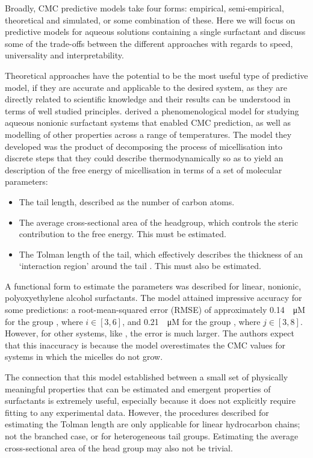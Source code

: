 Broadly, CMC predictive models take four forms: empirical, semi-empirical,
theoretical and simulated, or some combination of these. Here we will focus on
predictive models for aqueous solutions containing a single surfactant and
discuss some of the trade-offs between the different approaches with regards to
speed, universality and interpretability.

Theoretical approaches have the potential to be the most useful type of
predictive model, if they are accurate and applicable to the desired system, as
they are directly related to scientific knowledge and their results can be
understood in terms of well studied principles.
\citet{puvvadaMolecularThermodynamicApproach1990} derived a phenomenological
model for studying aqueous nonionic surfactant systems that enabled CMC
prediction, as well as modelling of other properties across a range of
temperatures. The model they developed was the product of decomposing the
process of micellisation into discrete steps that they could describe
thermodynamically so as to yield an description of the free energy of
micellisation in terms of a set of molecular parameters:

\begin{itemize}
    \item The tail length, described as the number of carbon atoms.
    \item The average cross-sectional area of the headgroup, which controls the
        steric contribution to the free energy. This must be estimated.
    \item The Tolman length of the tail, which effectively describes the
        thickness of an `interaction region' around the tail
        \cite{demiguelGibbsThermodynamicsSurface2021}. This must also be estimated.
\end{itemize}

A functional form to estimate the parameters was described for linear, nonionic,
polyoxyethylene alcohol surfactants. The model attained impressive accuracy for
some predictions: a root-mean-squared error (RMSE) of approximately
\SI{0.14}{\log \micro M} for the group , where $i \in [3, 6]$, and
\SI{0.21}{\log \micro M} for the group , where $j \in [3, 8]$.
However, for other systems, like , the error is much larger. The
authors expect that this inaccuracy is because the model overestimates the CMC
values for systems in which the micelles do not grow.

The connection that this model established between a small set of physically
meaningful properties that can be estimated and emergent properties of
surfactants is extremely useful, especially because it does not explicitly
require fitting to any experimental data. However, the procedures described for
estimating the Tolman length are only applicable for linear hydrocarbon chains;
not the branched case, or for heterogeneous tail groups. Estimating the average
cross-sectional area of the head group may also not be trivial.

